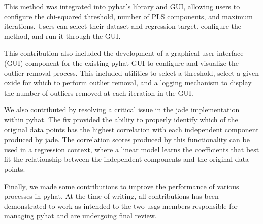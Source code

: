 This method was integrated into \gls{pyhat}'s library and GUI, allowing users to configure the chi-squared threshold, number of PLS components, and maximum iterations. 
Users can select their dataset and regression target, configure the method, and run it through the GUI.


This contribution also included the development of a graphical user interface (GUI) component for the existing \gls{pyhat} GUI to configure and visualize the outlier removal process.
This included utilities to select a threshold, select a given oxide for which to perform outlier removal, and a logging mechanism to display the number of outliers removed at each iteration in the GUI.

We also contributed by resolving a critical issue in the \gls{jade} implementation within \gls{pyhat}.
The fix provided the ability to properly identify which of the original data points has the highest correlation with each independent component produced by \gls{jade}. 
The correlation scores produced by this functionality can be used in a regression context, where a linear model learns the coefficients that best fit the relationship between the independent components and the original data points.

Finally, we made some contributions to improve the performance of various processes in \gls{pyhat}.
At the time of writing, all contributions has been demonstrated to work as intended to the two \gls{usgs} members responsible for managing \gls{pyhat} and are undergoing final review.

 